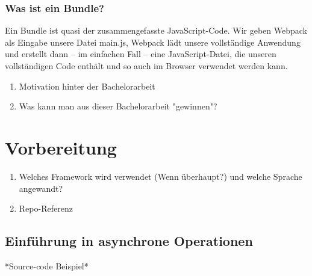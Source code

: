 \subsubsection{Was ist ein Bundle?}

Ein Bundle ist quasi der zusammengefasste JavaScript-Code. Wir geben Webpack als Eingabe unsere Datei main.js, Webpack lädt unsere vollständige Anwendung und erstellt dann – im einfachen Fall – eine JavaScript-Datei, die unseren vollständigen Code enthält und so auch im Browser verwendet werden kann.\cite{Webpack-basics}

\begin{enumerate} 
\item Motivation hinter der Bachelorarbeit
\item Was kann man aus dieser Bachelorarbeit "gewinnen"?
\end{enumerate}

\section{Vorbereitung}
\begin{enumerate} 
\item Welches Framework wird verwendet (Wenn überhaupt?) und welche Sprache angewandt?
\item Repo-Referenz
\end{enumerate}

\subsection{Einführung in asynchrone Operationen}
*Source-code Beispiel*